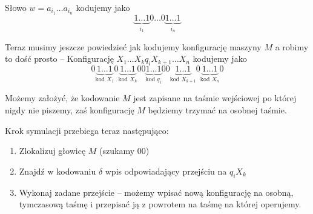 Słowo \( w = a_{i_1} \dots a_{i_n} \) kodujemy jako
\[
	\underbrace{1 \dots 1}_{i_1} 0 \dots 0 \underbrace{1 \dots 1}_{i_n}
\]

Teraz musimy jeszcze powiedzieć jak kodujemy konfigurację maszyny \( M \) a robimy to dość prosto --
Konfigurację \( X_1 \dots X_k q_i X_{k+1} \dots X_n \) kodujemy jako
\[
	0\underbrace{1 \dots 1}_{\text{kod } X_1} 0 \underbrace{1 \dots 1}_{\text{kod } X_k} 00 \underbrace{1 \dots 1}_{\text{kod } q_i} 00 \underbrace{1 \dots 1}_{\text{kod } X_{k + 1}} 0 \underbrace{1 \dots 1}_{\text{kod } X_n} 0
\]

Możemy założyć, że kodowanie \( M \) jest zapisane na taśmie wejściowej po której nigdy nie piszemy, zaś konfigurację \( M \) będziemy trzymać na osobnej taśmie.

Krok symulacji przebiega teraz następująco:
\begin{enumerate}
	\item Zlokalizuj głowicę \( M \) (szukamy \( 00 \))
	\item Znajdź w kodowaniu \( \delta \) wpis odpowiadający przejściu na \( q_i X_k \)
	\item Wykonaj zadane przejście -- możemy wpisać nową konfigurację na osobną, tymczasową taśmę i przepisać ją z powrotem na taśmę na której operujemy.

\end{enumerate}
